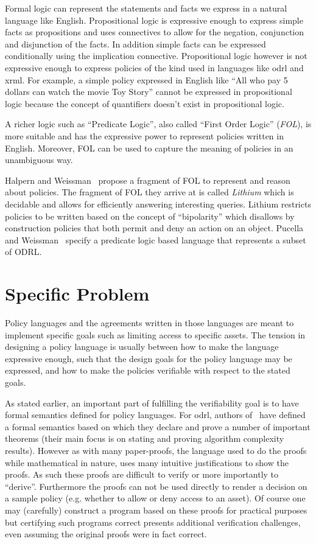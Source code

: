 Formal logic can represent the statements and facts we express in a natural language like English. Propositional logic is expressive enough to express simple facts as propositions and uses connectives to allow for the negation, conjunction and disjunction of the facts. In addition simple facts can be expressed conditionally using the implication connective. Propositional logic however is not expressive enough to express policies of the kind used in languages like \ac{odrl} and \ac{xrml}. For example, a simple policy expressed in English like ``All who pay 5 dollars can watch the movie Toy Story'' cannot be expressed in propositional logic because the concept of quantifiers doesn't exist in propositional logic. 

A richer logic such as ``Predicate Logic'', also called ``First Order Logic'' (\emph{FOL}), is more suitable and has the expressive power to represent policies written in English. Moreover, FOL can be used to capture the meaning of policies in an unambiguous way.

Halpern and Weissman~\cite{Halpern2008} propose a fragment of FOL to represent and reason about policies. The fragment of FOL they arrive at is called \emph{Lithium} which is decidable and allows for efficiently answering interesting queries. Lithium restricts policies to be written based on the concept of ``bipolarity'' which disallows by construction policies that both permit and deny an action on an object. Pucella and Weissman~\cite{pucella2006} specify a predicate logic based language that represents a subset of ODRL.


\section{Specific Problem}

Policy languages and the agreements written in those languages are meant to implement specific goals such as limiting access to specific assets. The tension in designing a policy language is usually between how to make the language expressive enough, such that the design goals for the policy language may be expressed, and how to make the policies verifiable with respect to the stated goals.

As stated earlier, an important part of fulfilling the verifiability goal is to have formal semantics defined for policy languages. For \ac{odrl}, authors of~\cite{pucella2006} have defined a formal semantics based on which they declare and prove a number of important theorems (their main focus is on stating and proving algorithm complexity results). However as with many paper-proofs, the language used to do the proofs while mathematical in nature, uses many intuitive justifications to show the proofs. As such these proofs are difficult to verify or more importantly to ``derive''. Furthermore the proofs can not be used directly to render a decision on a sample policy (e.g. whether to allow or deny access to an asset). Of course one may (carefully) construct a program based on these proofs for practical purposes but certifying such programs correct presents additional verification challenges, even assuming the original proofs were in fact correct.

